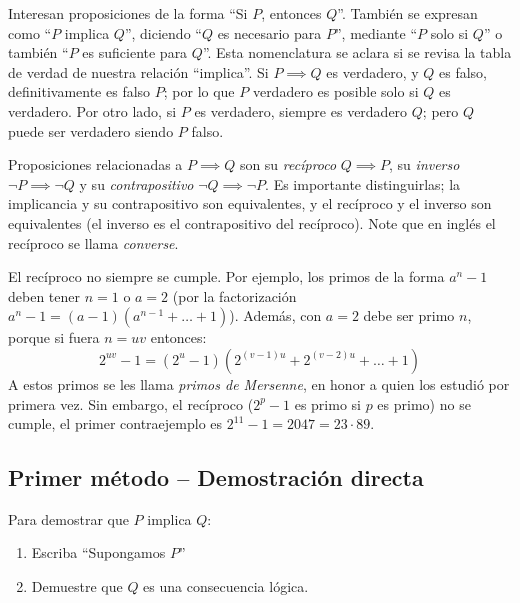   Interesan proposiciones de la forma ``Si \(P\), entonces \(Q\)''.
  También se expresan como ``\(P\) implica \(Q\)'',
  diciendo ``\(Q\) es necesario para \(P\)'',%
  mediante ``\(P\) solo si \(Q\)''
  o también ``\(P\) es suficiente para \(Q\)''.%
  Esta nomenclatura se aclara si se revisa la tabla de verdad
  de nuestra relación ``implica''.
  Si \(P \implies Q\) es verdadero,
  y \(Q\) es falso,
  definitivamente es falso \(P\);
  por lo que \(P\) verdadero es posible solo si \(Q\) es verdadero.
  Por otro lado,
  si \(P\) es verdadero,
  siempre es verdadero \(Q\);
  pero \(Q\) puede ser verdadero siendo \(P\) falso.

  Proposiciones relacionadas a \(P \implies Q\)
  son su \emph{recíproco} \(Q \implies P\),%
  su \emph{inverso} \(\neg P \implies \neg Q\)%
  y su \emph{contrapositivo} \(\neg Q \implies \neg P\).%
  Es importante distinguirlas;
  la implicancia y su contrapositivo son equivalentes,
  y el recíproco y el inverso son equivalentes
  (el inverso es el contrapositivo del recíproco).
  Note que en inglés el recíproco
  se llama \emph{\foreignlanguage{english}{converse}}.

  El recíproco no siempre se cumple.
  Por ejemplo,
  los primos de la forma \(a^n - 1\)
  deben tener \(n = 1\) o \(a = 2\)
  (por la factorización
     \(a^n - 1 = (a - 1) (a^{n - 1} + \dotsc + 1)\)).
  Además,
  con \(a = 2\) debe ser primo \(n\),
  porque si fuera \(n = u v\) entonces:
  \begin{equation*}
    2^{u v} - 1
      = (2^u - 1) (2^{(v - 1) u} + 2^{(v - 2) u} + \dotsc + 1)
  \end{equation*}
  A estos primos se les llama \emph{primos de Mersenne},
  en honor a quien los estudió por primera vez.
  Sin embargo,
  el recíproco
  (\(2^p - 1\) es primo si \(p\) es primo)
  no se cumple,
  el primer contraejemplo es \(2^{11} - 1 = 2047 = 23 \cdot 89\).

\subsection{Primer método -- Demostración directa}
\label{sec:implicancias-1}

  Para demostrar que \(P\) implica \(Q\):
  \begin{enumerate}
  \item
    Escriba ``Supongamos \(P\)''
  \item
    Demuestre que \(Q\) es una consecuencia lógica.
  \end{enumerate}

